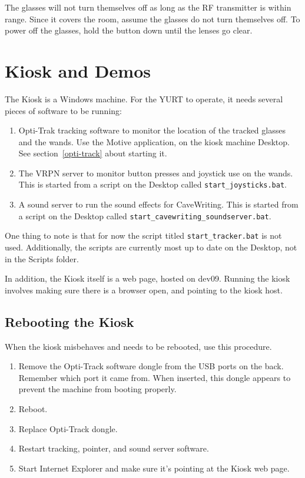 \documentclass[11pt]{article}
\newcommand{\yurt}{YURT\xspace}
\newcommand{\cmd}[1]{\texttt{#1}\xspace}
\begin{document}
The glasses will not turn themselves off as long as the RF transmitter
is within range.  Since it covers the room, assume the glasses do not
turn themselves off.  To power off the glasses, hold the button down
until the lenses go clear.

\section{Kiosk and Demos}

The Kiosk is a Windows machine.  For the \yurt to operate, it needs
several pieces of software to be running:

\begin{enumerate}
\item Opti-Trak tracking software to monitor the location of the
  tracked glasses and the wands.  Use the Motive application, on the
  kiosk machine Desktop.  See section~\ref{opti-track} about starting
  it. 

\item The VRPN server to monitor button presses and joystick use on
  the wands.  This is started from a script on the Desktop called \cmd{start\_joysticks.bat}.

\item A sound server to run the sound effects for CaveWriting.  This
  is started from a script on the Desktop called \cmd{start\_cavewriting\_soundserver.bat}.

\end{enumerate}


One thing to note is that for now the script titled \cmd{start\_tracker.bat} is not used. Additionally, the scripts are currently most up to date on the Desktop, not in the Scripts folder.

In addition, the Kiosk itself is a web page, hosted on dev09.  Running
the kiosk involves making sure there is a browser open, and pointing
to the kiosk host.


\subsection{Rebooting the Kiosk}

When the kiosk misbehaves and needs to be rebooted, use this
procedure.

\begin{enumerate}
\item Remove the Opti-Track software dongle from the USB ports on the
  back.  Remember which port it came from.  When inserted, this dongle
  appears to prevent the machine from booting properly.

\item Reboot.

\item Replace Opti-Track dongle.

\item Restart tracking, pointer, and sound server software.

\item Start Internet Explorer and make sure it's pointing at the Kiosk
  web page.

\end{enumerate}
\end{document}
